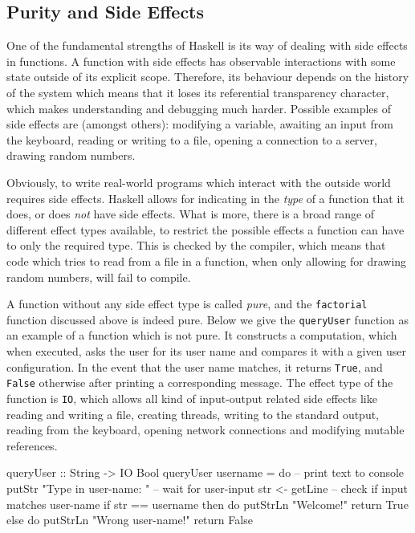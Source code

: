 \subsection{Purity and Side Effects}
\label{sec:purity_sideeffects}
One of the fundamental strengths of Haskell is its way of dealing with side effects in functions. A function with side effects has observable interactions with some state outside of its explicit scope. Therefore, its behaviour depends on the history of the system which means that it loses its referential transparency character, which makes understanding and debugging much harder. Possible examples of side effects are (amongst others): modifying a variable, awaiting an input from the keyboard, reading or writing to a file, opening a connection to a server, drawing random numbers.

Obviously, to write real-world programs which interact with the outside world requires side effects. Haskell allows for indicating in the \textit{type} of a function that it does, or does \textit{not} have side effects. What is more, there is a broad range of different effect types available, to restrict the possible effects a function can have to only the required type. This is checked by the compiler, which means that code which tries to read from a file in a function, when only allowing for drawing random numbers, will fail to compile.

A function without any side effect type is called \textit{pure}, and the \texttt{factorial} function discussed above is indeed pure. Below we give the \texttt{queryUser} function as an example of a function which is not pure. It constructs a computation, which when executed, asks the user for its user name and compares it with a given user configuration. In the event that the user name matches, it returns \texttt{True}, and \texttt{False} otherwise after printing a corresponding message. The effect type of the function is \texttt{IO}, which allows all kind of input-output related side effects like reading and writing a file, creating threads, writing to the standard output, reading from the keyboard, opening network connections and modifying mutable references.

\begin{HaskellCode}
queryUser :: String -> IO Bool
queryUser username = do
  -- print text to console
  putStr "Type in user-name: "
  -- wait for user-input
  str <- getLine
  -- check if input matches user-name
  if str == username
    then do
      putStrLn "Welcome!"			
      return True
    else do
      putStrLn "Wrong user-name!"
      return False
\end{HaskellCode}

